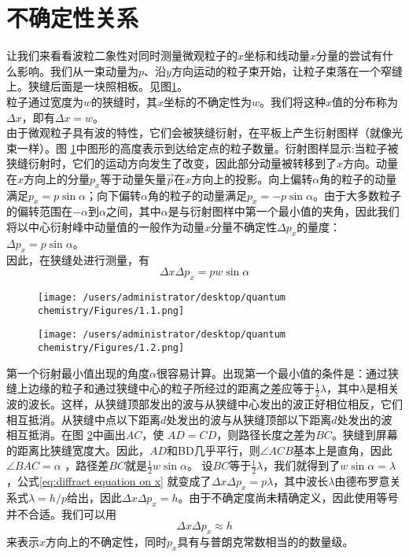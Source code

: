 \documentclass{book}
\begin{document}
	\section{不确定性关系}
	让我们来看看波粒二象性对同时测量微观粒子的$x$坐标和线动量$x$分量的尝试有什么影响。我们从一束动量为$p$、沿$y$方向运动的粒子束开始，让粒子束落在一个窄缝上。狭缝后面是一块照相板。见图\ref{fig:1.1}。\\
	\indent 粒子通过宽度为$w$的狭缝时，其$x$坐标的不确定性为$w$。我们将这种$x$值的分布称为$\Delta x$，即有$\Delta x = w$。\\
	\indent 由于微观粒子具有波的特性，它们会被狭缝衍射，在平板上产生衍射图样（就像光束一样）。图 \ref{fig:1.1}中图形的高度表示到达给定点的粒子数量。衍射图样显示:当粒子被狭缝衍射时，它们的运动方向发生了改变，因此部分动量被转移到了$x$方向。动量在$x$方向上的分量$p_x$等于动量矢量$\overrightarrow{p}$在$x$方向上的投影。向上偏转$\alpha$角的粒子的动量满足$p_x=p\sin \alpha$；向下偏转$\alpha$角的粒子的动量满足$p_x=-p \sin \alpha$。由于大多数粒子的偏转范围在$-\alpha$到$\alpha$之间，其中$\alpha$是与衍射图样中第一个最小值的夹角，因此我们将以中心衍射峰中动量值的一般作为动量$x$分量不确定性$\Delta p_x$的量度：$\Delta p_x = p \sin \alpha$。\\
	\indent 因此，在狭缝处进行测量，有
	\begin{equation}
		\Delta x \Delta p_x = pw \sin \alpha 
		\label{eq:diffract equation on x}
	\end{equation}
	
	\begin{figure}[h!]
		\centering
		\texttt{[image: /users/administrator/desktop/quantum chemistry/Figures/1.1.png]}  %
		\caption{}
		\label{fig:1.1}
	\end{figure}
	\begin{figure}[h!]
		\centering
		\texttt{[image: /users/administrator/desktop/quantum chemistry/Figures/1.2.png]}
		\caption{}
		\label{fig:1.2}
	\end{figure}
	
	\indent 第一个衍射最小值出现的角度$\alpha$很容易计算。出现第一个最小值的条件是：通过狭缝上边缘的粒子和通过狭缝中心的粒子所经过的距离之差应等于$\frac{1}{2}\lambda$，其中$\lambda$是相关波的波长。这样，从狭缝顶部发出的波与从狭缝中心发出的波正好相位相反，它们相互抵消。从狭缝中点以下距离$d$处发出的波与从狭缝顶部以下距离$d$处发出的波相互抵消。在图 \ref{fig:1.2}中画出$AC$，使 $AD=CD$，则路径长度之差为$BC$。狭缝到屏幕的距离比狭缝宽度大。因此，$AD和$BD几乎平行，则$\angle ACB$基本上是直角，因此$\angle BAC = \alpha$ ，路径差$BC$就是$\frac{1}{2}w \sin \alpha$。 设$BC$等于$\frac{1}{2}\lambda$，我们就得到了$w\sin\alpha=\lambda$，公式\ref{eq:diffract equation on x} 就变成了$\Delta x \Delta p_x=p\lambda$，其中波长$\lambda$由德布罗意关系式$\lambda=h/p$给出，因此$\Delta x \Delta p_x=h$。由于不确定度尚未精确定义，因此使用等号并不合适。我们可以用 
	\begin{equation}
		\Delta x \Delta p_x \approx h
		\label{eq:uncertinty on x}
	\end{equation}
	来表示$x$方向上的不确定性，同时$p_x$具有与普朗克常数相当的的数量级。
	
\end{document}
